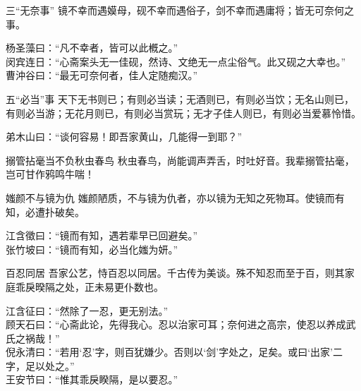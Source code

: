 \begin{yulu}{三“无奈事”}
镜不幸而遇嫫母，砚不幸而遇俗子，剑不幸而遇庸将；皆无可奈何之事。
\begin{comments}
杨圣藻曰：“凡不幸者，皆可以此槪之。” \\
闵宾连日：“心斋案头无一佳砚，然诗、文绝无一点尘俗气。此又砚之大幸也。” \\
曹沖谷曰：“最无可奈何者，佳人定随痴汉。”
\end{comments}
\end{yulu}

\begin{yulu}{五“必当”事}
天下无书则已；有则必当读；无酒则已，有则必当饮；无名山则已，有则必当游；无花月则已，有则必当赏玩；无才子佳人则已，有则必当爱慕怜惜。
\begin{comments}
弟木山曰：“谈何容易！即吾家黄山，几能得一到耶？”
\end{comments}
\end{yulu}

\begin{yulu}{搦管拈毫当不负秋虫春鸟}
秋虫春鸟，尚能调声弄舌，时吐好音。我辈搦管拈毫，岂可甘作鸦鸣牛喘！
\begin{comments}

\end{comments}
\end{yulu}

\begin{yulu}{媸颜不与镜为仇}
媸颜陋质，不与镜为仇者，亦以镜为无知之死物耳。使镜而有知，必遭扑破矣。
\begin{comments}
江含徵曰：“镜而有知，遇若辈早已回避矣。” \\
张竹坡曰：“镜而有知，必当化媸为妍。”
\end{comments}
\end{yulu}

\begin{yulu}{百忍同居}
吾家公艺，恃百忍以同居。千古传为美谈。殊不知忍而至于百，则其家庭乖戾暌隔之处，正未易更仆数也。
\begin{comments}
江含征曰：“然除了一忍，更无别法。” \\
顾天石曰：“心斋此论，先得我心。忍以治家可耳；奈何进之高宗，使忍以养成武氏之祸哉！” \\
倪永清曰：“若用‘忍’字，则百犹嫌少。否则以‘剑’字处之，足矣。或曰‘出家’二字，足以处之。” \\
王安节曰：“惟其乖戾睽隔，是以要忍。”
\end{comments}
\end{yulu}

